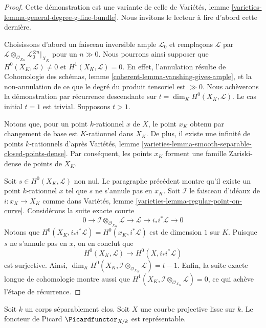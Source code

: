 \begin{proof}
Cette démonstration est une variante de celle de
Variétés, lemme \ref{varieties-lemma-general-degree-g-line-bundle}.
Nous invitons le lecteur à lire d'abord cette dernière.

\medskip\noindent
Choisissons d'abord un faisceau inversible ample $\mathcal{L}_0$ et
remplaçons $\mathcal{L}$ par
$\mathcal{L} \otimes_{\mathcal{O}_{X_K}} \mathcal{L}_0^{\otimes n}|_{X_K}$
pour un $n \gg 0$. Nous pourrons ainsi supposer que
$H^0(X_K, \mathcal{L}) \not = 0$ et $H^1(X_K, \mathcal{L}) = 0$.
En effet, l'annulation résulte de Cohomologie des schémas, lemme
\ref{coherent-lemma-vanshing-gives-ample}, et la non-annulation de ce que
le degré du produit tensoriel est $\gg 0$.
Nous achèverons la démonstration par récurrence descendante sur
$t = \dim_K H^0(X_K, \mathcal{L})$. Le cas initial $t = 1$ est trivial.
Supposons $t > 1$.

\medskip\noindent
Notons que, pour un point $k$-rationnel $x$ de $X$, le point $x_K$
obtenu par changement de base est $K$-rationnel dans $X_K$. De plus, il existe une infinité de
points $k$-rationnels d'après Variétés, lemme
\ref{varieties-lemma-smooth-separable-closed-points-dense}. Par conséquent,
les points $x_K$ forment une famille Zariski-dense de points de $X_K$.

\medskip\noindent
Soit $s \in H^0(X_K, \mathcal{L})$ non nul. Le paragraphe précédent
montre qu'il existe un point $k$-rationnel
$x$ tel que $s$ ne s'annule pas en $x_K$. Soit $\mathcal{I}$
le faisceau d'idéaux de $i : x_K \to X_K$ comme dans
Variétés, lemme \ref{varieties-lemma-regular-point-on-curve}. Considérons la
suite exacte courte
$$
0 \to \mathcal{I} \otimes_{\mathcal{O}_{X_K}} \mathcal{L} \to
\mathcal{L} \to i_*i^*\mathcal{L} \to 0
$$
Notons que $H^0(X_K, i_*i^*\mathcal{L}) = H^0(x_K, i^*\mathcal{L})$
est de dimension $1$ sur $K$. Puisque $s$ ne s'annule pas en $x$, on en conclut que
$$
H^0(X_K, \mathcal{L}) \longrightarrow H^0(X, i_*i^*\mathcal{L})
$$
est surjective. Ainsi,
$\dim_K H^0(X_K, \mathcal{I} \otimes_{\mathcal{O}_{X_K}} \mathcal{L}) = t - 1$.
Enfin, la suite exacte longue de cohomologie montre aussi que
$H^1(X_K, \mathcal{I} \otimes_{\mathcal{O}_{X_K}} \mathcal{L}) = 0$,
ce qui achève l'étape de récurrence.
\end{proof}

\begin{proposition}
\label{proposition-pic-curve}
Soit $k$ un corps séparablement clos. Soit $X$ une courbe projective lisse
sur $k$. Le foncteur de Picard $\Picardfunctor_{X/k}$ est représentable.
\end{proposition}

